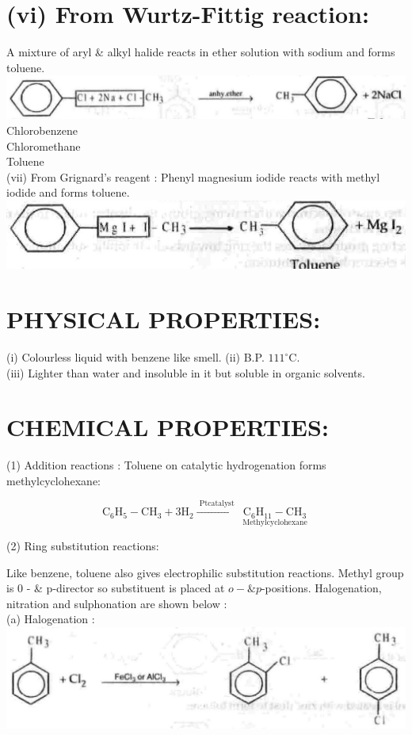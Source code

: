 \documentclass[10pt]{article}
\begin{document}
\section*{(vi) From Wurtz-Fittig reaction:}
A mixture of aryl \& alkyl halide reacts in ether solution with sodium and forms toluene.\\
\includegraphics[max width=\textwidth, center]{2025_01_28_8470952b98110cec3aabg-214}\\
Chlorobenzene\\
Chloromethane\\
Toluene\\
(vii) From Grignard's reagent : Phenyl magnesium iodide reacts with methyl iodide and forms toluene.\\
\includegraphics[max width=\textwidth, center]{2025_01_28_8470952b98110cec3aabg-214(1)}

\section*{PHYSICAL PROPERTIES:}
(i) Colourless liquid with benzene like smell. (ii) B.P. $111^{\circ} \mathrm{C}$.\\
(iii) Lighter than water and insoluble in it but soluble in organic solvents.

\section*{CHEMICAL PROPERTIES:}
(1) Addition reactions : Toluene on catalytic hydrogenation forms methylcyclohexane:

$$
\mathrm{C}_{6} \mathrm{H}_{5}-\mathrm{CH}_{3}+3 \mathrm{H}_{2} \xrightarrow{\text { Ptcatalyst }} \underset{\text { Methylcyclohexane }}{\mathrm{C}_{6} \mathrm{H}_{11}-\mathrm{CH}_{3}}
$$

(2) Ring substitution reactions:

Like benzene, toluene also gives electrophilic substitution reactions. Methyl group is 0 - \& p-director so substituent is placed at $o-\& p$-positions. Halogenation, nitration and sulphonation are shown below :\\
(a) Halogenation :\\
\includegraphics[max width=\textwidth, center]{2025_01_28_8470952b98110cec3aabg-214(3)}
\end{document}
